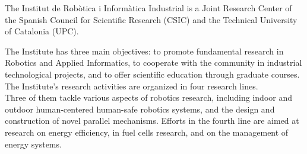 The Institut de Robòtica i Informàtica Industrial is a Joint Research Center of the Spanish Council for Scientific Research (CSIC) and the Technical University of Catalonia (UPC).

 The Institute has three main objectives: to promote fundamental research in Robotics and Applied Informatics, to cooperate with the community in industrial technological projects, and to offer scientific education through graduate courses.
The Institute's research activities are organized in four research lines.\\

Three of them tackle various aspects of robotics research, including indoor and outdoor human-centered human-safe robotics systems, and the design and construction of novel parallel mechanisms.
Efforts in the fourth line are aimed at research on energy efficiency, in fuel cells research, and on the management of energy systems.
